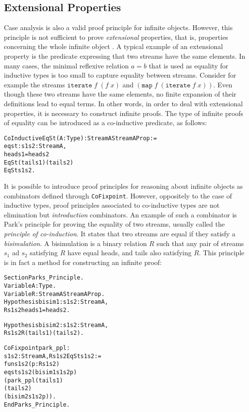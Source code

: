 \documentclass[11pt]{article}
\begin{document}
\subsection{Extensional Properties}

Case analysis is also a valid proof principle for infinite
objects. However, this principle is not sufficient to prove
\textsl{extensional} properties, that is, properties concerning the
whole infinite object \cite{EG95a}. A typical example of an
extensional property is the predicate expressing that two streams have
the same elements. In many cases, the minimal reflexive relation $a=b$
that is used as equality for inductive types is too small to capture
equality between streams. Consider for example the streams
$\texttt{iterate}\;f\;(f\;x)$ and
$(\texttt{map}\;f\;(\texttt{iterate}\;f\;x))$. Even though these two streams have
the same elements, no finite expansion of their definitions lead to
equal terms. In other words, in order to deal with extensional
properties, it is necessary to construct infinite proofs. The type of
infinite proofs of equality can be introduced as a co-inductive
predicate, as follows:
\begin{alltt}
CoInductive EqSt (A: Type) : Stream A {\arrow} Stream A {\arrow} Prop :=
  eqst : {\prodsym} s1 s2: Stream A,
      head s1 = head s2 {\arrow}
      EqSt (tail s1) (tail s2) {\arrow}
      EqSt s1 s2.
\end{alltt}

It is possible to introduce proof principles for reasoning about
infinite objects as combinators defined through
\texttt{CoFixpoint}. However, oppositely to the case of inductive
types, proof principles associated to co-inductive types are not
elimination but \textsl{introduction} combinators. An example of such
a combinator is Park's principle for proving the equality of two
streams, usually called the \textsl{principle of co-induction}. It
states that two streams are equal if they satisfy a
\textit{bisimulation}.  A bisimulation is a binary relation $R$ such
that any pair of streams $s_1$ ad $s_2$ satisfying $R$ have equal
heads, and tails also satisfying $R$.  This principle is in fact a
method for constructing an infinite proof:

\begin{alltt}
Section Parks_Principle.
Variable A : Type.
Variable    R      : Stream A {\arrow} Stream A {\arrow} Prop.
Hypothesis  bisim1 : {\prodsym} s1 s2:Stream A,
                       R s1 s2 {\arrow} head s1 = head s2.

Hypothesis  bisim2 : {\prodsym} s1 s2:Stream A,
                       R s1 s2 {\arrow} R (tail s1) (tail s2).

CoFixpoint park_ppl     :
 {\prodsym} s1 s2:Stream A, R s1 s2 {\arrow} EqSt s1 s2 :=
 fun s1 s2 (p : R s1 s2) {\funarrow}
      eqst s1 s2 (bisim1 s1 s2 p)
                 (park_ppl (tail s1)
                           (tail s2)
                           (bisim2 s1 s2 p)).
End Parks_Principle.
\end{alltt}
\end{document}
